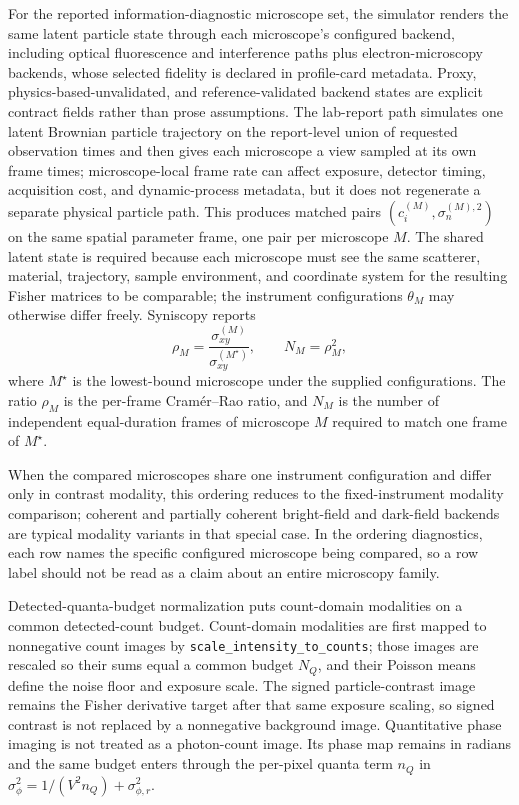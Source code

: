 For the reported information-diagnostic microscope set, the simulator renders the same latent particle state through each microscope's configured backend, including optical fluorescence and interference paths plus electron-microscopy backends, whose selected fidelity is declared in profile-card metadata. Proxy, physics-based-unvalidated, and reference-validated backend states are explicit contract fields rather than prose assumptions. The lab-report path simulates one latent Brownian particle trajectory on the report-level union of requested observation times and then gives each microscope a view sampled at its own frame times; microscope-local frame rate can affect exposure, detector timing, acquisition cost, and dynamic-process metadata, but it does not regenerate a separate physical particle path. This produces matched pairs $(c_i^{(M)},\sigma_n^{(M),2})$ on the same spatial parameter frame, one pair per microscope $M$. The shared latent state is required because each microscope must see the same scatterer, material, trajectory, sample environment, and coordinate system for the resulting Fisher matrices to be comparable; the instrument configurations $\theta_M$ may otherwise differ freely. Syniscopy reports
\begin{equation}
  \rho_M = \frac{\sigma_{xy}^{(M)}}{\sigma_{xy}^{(M^\star)}} ,
  \qquad
  N_M = \rho_M^2 ,
\end{equation}
where $M^\star$ is the lowest-bound microscope under the supplied configurations. The ratio $\rho_M$ is the per-frame Cram\'{e}r--Rao ratio, and $N_M$ is the number of independent equal-duration frames of microscope $M$ required to match one frame of $M^\star$.

When the compared microscopes share one instrument configuration and differ only in contrast modality, this ordering reduces to the fixed-instrument modality comparison; coherent and partially coherent bright-field and dark-field backends are typical modality variants in that special case. In the ordering diagnostics, each row names the specific configured microscope being compared, so a row label should not be read as a claim about an entire microscopy family.

Detected-quanta-budget normalization puts count-domain modalities on a common detected-count budget. Count-domain modalities are first mapped to nonnegative count images by \texttt{scale\_intensity\_to\_counts}; those images are rescaled so their sums equal a common budget $N_Q$, and their Poisson means define the noise floor and exposure scale. The signed particle-contrast image remains the Fisher derivative target after that same exposure scaling, so signed contrast is not replaced by a nonnegative background image. Quantitative phase imaging is not treated as a photon-count image. Its phase map remains in radians and the same budget enters through the per-pixel quanta term $n_Q$ in $\sigma_\phi^2=1/(V^2n_Q)+\sigma_{\phi,r}^2$.


